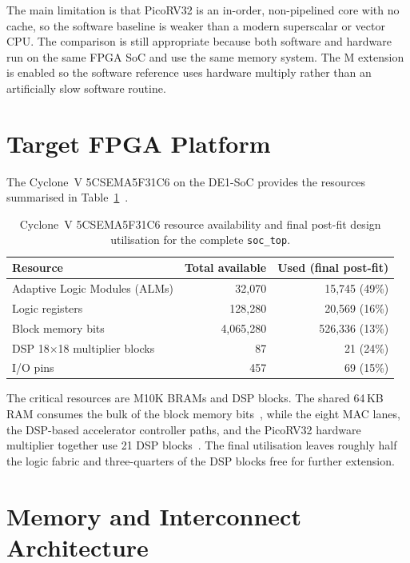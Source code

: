 The main limitation is that PicoRV32 is an in-order, non-pipelined core
with no cache, so the software baseline is weaker than a modern
superscalar or vector CPU. The comparison is still appropriate because
both software and hardware run on the same FPGA SoC and use the same
memory system. The M extension is enabled so the software reference uses
hardware multiply rather than an artificially slow software routine.


\vspace{4cm}

\section{Target FPGA Platform}

The Cyclone~V 5CSEMA5F31C6 on the DE1-SoC provides the resources summarised
in Table~\ref{tab:fpga-resources}~\citep{cyclonev_handbook}.

\begin{table}[htbp]
  \centering
  \small
  \begin{tabular}{lrr}
  \toprule
  Resource & Total available & Used (final post-fit) \\
  \midrule
  Adaptive Logic Modules (ALMs) & 32,070 & 15,745 (49\%) \\
  Logic registers & 128,280 & 20,569 (16\%) \\
  Block memory bits & 4,065,280 & 526,336 (13\%) \\
  DSP 18$\times$18 multiplier blocks & 87 & 21 (24\%) \\
  I/O pins & 457 & 69 (15\%) \\
  \bottomrule
  \end{tabular}
  \caption{Cyclone~V 5CSEMA5F31C6 resource availability and final
           post-fit design utilisation for the complete \texttt{soc\_top}.}
  \label{tab:fpga-resources}
\end{table}

The critical resources are M10K BRAMs and DSP blocks. The shared 64\,KB
RAM consumes the bulk of the block memory bits~\citep{intel_m10k}, while
the eight MAC lanes, the DSP-based accelerator controller paths, and the
PicoRV32 hardware multiplier together use 21 DSP
blocks~\citep{intel_dsp_blocks}. The final utilisation leaves roughly
half the logic fabric and three-quarters of the DSP blocks free for
further extension.

\section{Memory and Interconnect Architecture}
\label{sec:memory-arch}

